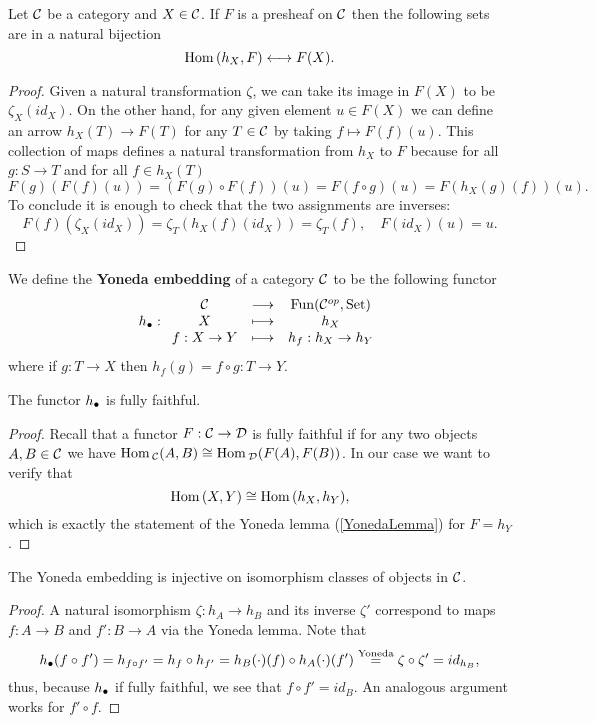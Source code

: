 \begin{lemma}\label{YonedaLemma}
Let $\mathcal{C}$ be a category and $X\in \mathcal{C}$. If $F$ is a presheaf on $\mathcal{C}$ then the following sets are in a natural bijection
\[\mathrm{Hom}\,(h_X,F)\longleftrightarrow F(X).\]
\end{lemma}
\begin{proof}
Given a natural transformation $\zeta$, we can take its image in $F(X)$ to be $\zeta_X(id_X)$.
On the other hand, for any given element $u\in F(X)$ we can define an arrow $h_X(T)\to F(T)$ for any $T\in \mathcal{C}$ by taking $f\mapsto F(f)(u)$. This collection of maps defines a natural transformation from $h_X$ to $F$ because for all $g:S\to T$ and for all $f\in h_X(T)$
\[F(g)(F(f)(u))=(F(g)\circ F(f))(u)=F(f\circ g)(u)=F(h_X(g)(f))(u).\]
To conclude it is enough to check that the two assignments are inverses:
\[F(f)(\zeta_X(id_X))=\zeta_T(h_X(f)(id_X))=\zeta_T(f),\quad F(id_X)(u)=u.\]
\end{proof}

\begin{definition}
We define the \textbf{Yoneda embedding} of a category $\mathcal{C}$ to be the following functor
\[{h_\bullet}:\begin{array}{ccc} {\mathcal{C}} & \longrightarrow & {\mathrm{Fun}(\mathcal{C}^{op},\mathrm{Set})}\\ {X} & \longmapsto & {h_X}\\ {f:X\to Y} & \longmapsto & {h_f:h_X\to h_Y} \end{array}\]
where if $g:T\to X$ then $h_f(g)=f\circ g:T\to Y$.
\end{definition}


\begin{proposition}
The functor ${h_\bullet}$ is fully faithful.
\end{proposition}
\begin{proof}
Recall that a functor $F:\mathcal{C}\to \mathcal{D}$ is fully faithful if for any two objects $A,B\in\mathcal{C}$ we have $\mathrm{Hom}\,_{\mathcal{C}}(A,B)\cong \mathrm{Hom}\,_{\mathcal{D}}(F(A),F(B))$. In our case we want to verify that
\[\mathrm{Hom}\,(X,Y)\cong\mathrm{Hom}\,(h_X,h_Y),\]
which is exactly the statement of the Yoneda lemma (\ref{YonedaLemma}) for $F=h_Y$.
\end{proof}
\begin{proposition}\label{YonedaEmbeddingInjectiveOnIsoClasses}
The Yoneda embedding is injective on isomorphism classes of objects in $\mathcal{C}$.
\end{proposition}
\begin{proof}
A natural isomorphism $\zeta:h_A\to h_B$ and its inverse $\zeta'$ correspond to maps $f:A\to B$ and $f':B\to A$ via the Yoneda lemma. Note that
\[{h_\bullet}(f\circ f')=h_{f\circ f'}=h_f\circ h_{f'}=h_B(\cdot)(f)\circ h_A(\cdot)(f')\overset{\text{Yoneda}}=\zeta\circ \zeta'=id_{h_B},\]
thus, because ${h_\bullet}$ if fully faithful, we see that $f\circ f'=id_B$. An analogous argument works for $f'\circ f$.
\end{proof}

